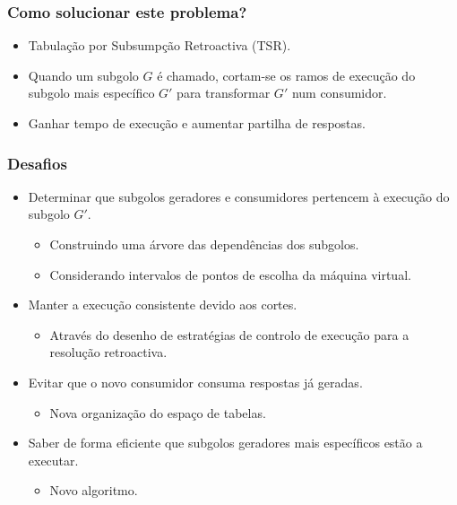 \documentclass{beamer}
\begin{document}
\begin{frame}
   \frametitle{Como solucionar este problema?}
   \begin{itemize}
      \item Tabulação por Subsumpção Retroactiva (TSR).
      \pause
      \item Quando um subgolo $G$ é chamado, cortam-se os ramos de execução do subgolo mais
      específico $G'$ para transformar $G'$ num consumidor.
      \pause
      \item Ganhar tempo de execução e aumentar partilha de respostas.
   \end{itemize}
\end{frame}

\begin{frame}
   \frametitle{Desafios}
   \begin{itemize}
      \item Determinar que subgolos geradores e consumidores pertencem à execução do subgolo $G'$.
      \begin{itemize}
         \pause
         \item Construindo uma árvore das dependências dos subgolos.
         \pause
         \item Considerando intervalos de pontos de escolha da máquina virtual.
      \end{itemize}
      \pause
      \item Manter a execução consistente devido aos cortes.
      \begin{itemize}
         \pause
         \item Através do desenho de estratégias de controlo de execução para a resolução retroactiva.
      \end{itemize}
      \pause
      \item Evitar que o novo consumidor consuma respostas já geradas.
      \begin{itemize}
         \pause
         \item Nova organização do espaço de tabelas.
      \end{itemize}
      \pause
      \item Saber de forma eficiente que subgolos geradores mais específicos estão a executar.
      \begin{itemize}
         \pause
         \item Novo algoritmo.
      \end{itemize}
   \end{itemize}
\end{frame}
\end{document}
